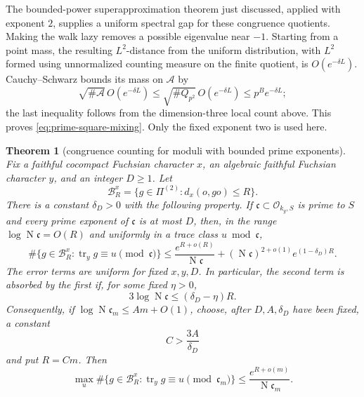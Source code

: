 \documentclass[11pt,reqno]{amsart}
\newtheorem{theorem}{Theorem}[section]
\theoremstyle{definition}
\theoremstyle{remark}
\newcommand{\cO}{\mathcal O}
\newcommand{\cB}{\mathcal B}
\newcommand{\Tr}{\operatorname{tr}}
\newcommand{\Norm}{\operatorname{N}}
\begin{document}
The bounded-power superapproximation theorem just discussed, applied with
exponent \(2\), supplies a uniform spectral gap for these congruence
quotients.  Making the walk lazy removes a
possible eigenvalue near \(-1\).  Starting from a point mass, the resulting
\(L^2\)-distance from the uniform distribution, with \(L^2\) formed using
unnormalized counting measure on the finite quotient, is
\(O(e^{-\delta L})\).  Cauchy--Schwarz bounds its mass on \(\mathcal A\) by
\[
 \sqrt{\#\mathcal A}\,O(e^{-\delta L})
 \le\sqrt{\#Q_{p^2}}\,O(e^{-\delta L})
 \le p^B e^{-\delta L};
\]
the last inequality follows from the dimension-three local count above.
This proves \eqref{eq:prime-square-mixing}.  Only the fixed exponent two is
used here.

\begin{theorem}[congruence counting for moduli with bounded prime
exponents]
\label{input:bounded-exponent-counting}
Fix a faithful cocompact Fuchsian character \(x\), an algebraic faithful
Fuchsian character \(y\), and an integer \(D\ge1\).  Let
\[
 \cB_R^x=\{g\in\Pi^{(2)}:d_x(o,go)\le R\}.
\]
There is a constant \(\delta_D>0\) with the following property.  If
\(\mathfrak c\subset\cO_{k_y,S}\) is prime to \(S\) and every prime
exponent of \(\mathfrak c\) is at most \(D\), then, in the range
\(\log\Norm\mathfrak c=O(R)\) and uniformly in a trace class
\(u\bmod\mathfrak c\),
\begin{equation}\label{eq:bounded-exponent-trace-count}
 \#\{g\in\cB_R^x:\Tr_y g\equiv u\pmod{\mathfrak c}\}
 \le
 \frac{e^{R+o(R)}}{\Norm\mathfrak c}
 +(\Norm\mathfrak c)^{2+o(1)}e^{(1-\delta_D)R}.
\end{equation}
The error terms are uniform for fixed \(x,y,D\).  In particular, the second
term is absorbed by the first if, for some fixed \(\eta>0\),
\begin{equation}\label{eq:counting-absorption-condition}
 3\log\Norm\mathfrak c\le(\delta_D-\eta)R.
\end{equation}
Consequently, if \(\log\Norm\mathfrak c_m\le Am+O(1)\), choose, after
\(D,A,\delta_D\) have been fixed, a constant
\begin{equation}\label{eq:radius-choice}
 C>\frac{3A}{\delta_D}
\end{equation}
and put \(R=Cm\).  Then
\begin{equation}\label{eq:bounded-exponent-flat-form}
 \max_u\#\{g\in\cB_R^x:\Tr_y g\equiv u\pmod{\mathfrak c_m}\}
 \le\frac{e^{R+o(m)}}{\Norm\mathfrak c_m}.
\end{equation}
\end{theorem}
\end{document}
